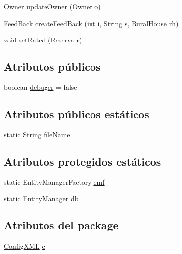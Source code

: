 \begin{DoxyCompactItemize}
\item 
\mbox{\hyperlink{classdomain_1_1_owner}{Owner}} \mbox{\hyperlink{classdata_access_1_1_data_access_af4bcb54cc90c7376889c7c9357d93416}{update\+Owner}} (\mbox{\hyperlink{classdomain_1_1_owner}{Owner}} o)
\item 
\mbox{\hyperlink{classdomain_1_1_feed_back}{Feed\+Back}} \mbox{\hyperlink{classdata_access_1_1_data_access_ab4812e588500fe2483a82a339a21e17a}{create\+Feed\+Back}} (int i, String s, \mbox{\hyperlink{classdomain_1_1_rural_house}{Rural\+House}} rh)
\item 
void \mbox{\hyperlink{classdata_access_1_1_data_access_afe99432043c4bf8bc7032858b51badbf}{set\+Rated}} (\mbox{\hyperlink{classdomain_1_1_reserva}{Reserva}} r)
\end{DoxyCompactItemize}
\subsection*{Atributos públicos}
\begin{DoxyCompactItemize}
\item 
boolean \mbox{\hyperlink{classdata_access_1_1_data_access_a3a2da087d6452771264c177c02ecab4a}{debuger}} = false
\end{DoxyCompactItemize}
\subsection*{Atributos públicos estáticos}
\begin{DoxyCompactItemize}
\item 
static String \mbox{\hyperlink{classdata_access_1_1_data_access_aba38e7b60b8d2dc1d112ac7b5e5e4693}{file\+Name}}
\end{DoxyCompactItemize}
\subsection*{Atributos protegidos estáticos}
\begin{DoxyCompactItemize}
\item 
static Entity\+Manager\+Factory \mbox{\hyperlink{classdata_access_1_1_data_access_a158d2718ef5a80f4f296b14937cc1775}{emf}}
\item 
static Entity\+Manager \mbox{\hyperlink{classdata_access_1_1_data_access_a0920d5a9c61bdae39ef950d6e4e187e4}{db}}
\end{DoxyCompactItemize}
\subsection*{Atributos del \textquotesingle{}package\textquotesingle{}}
\begin{DoxyCompactItemize}
\item 
\mbox{\hyperlink{classconfiguration_1_1_config_x_m_l}{Config\+X\+ML}} \mbox{\hyperlink{classdata_access_1_1_data_access_ad09e2bb7e62d0624ad4ed15307cb2e3e}{c}}
\end{DoxyCompactItemize}


